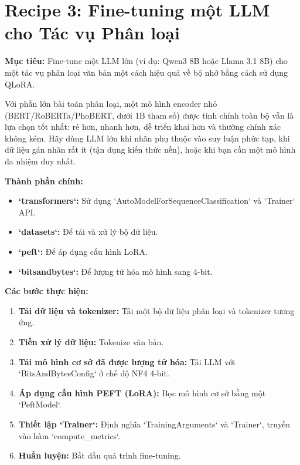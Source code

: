 
\section{Recipe 3: Fine-tuning một LLM cho Tác vụ Phân loại}
\label{sec:recipe_classification_finetuning}

\textbf{Mục tiêu:} Fine-tune một LLM lớn (ví dụ: Qwen3 8B hoặc Llama 3.1 8B) cho một tác vụ phân loại văn bản một cách hiệu quả về bộ nhớ bằng cách sử dụng QLoRA.

\begin{tcolorbox}[colback=yellow!10!white, colframe=yellow!50!black, title={Khi nào \emph{không} nên dùng công thức này \newtag}, fonttitle=\bfseries]
Với phần lớn bài toán phân loại, một mô hình encoder nhỏ (BERT/RoBERTa/PhoBERT, dưới 1B tham số) được tinh chỉnh toàn bộ vẫn là lựa chọn tốt nhất: rẻ hơn, nhanh hơn, dễ triển khai hơn và thường chính xác không kém. Hãy dùng LLM lớn khi nhãn phụ thuộc vào suy luận phức tạp, khi dữ liệu gán nhãn rất ít (tận dụng kiến thức nền), hoặc khi bạn cần một mô hình đa nhiệm duy nhất.
\end{tcolorbox}

\textbf{Thành phần chính:}
\begin{itemize}
    \item \textbf{`transformers`:} Sử dụng `AutoModelForSequenceClassification` và `Trainer` API.
    \item \textbf{`datasets`:} Để tải và xử lý bộ dữ liệu.
    \item \textbf{`peft`:} Để áp dụng cấu hình LoRA.
    \item \textbf{`bitsandbytes`:} Để lượng tử hóa mô hình sang 4-bit.
\end{itemize}

\textbf{Các bước thực hiện:}
\begin{enumerate}
    \item \textbf{Tải dữ liệu và tokenizer:} Tải một bộ dữ liệu phân loại và tokenizer tương ứng.
    \item \textbf{Tiền xử lý dữ liệu:} Tokenize văn bản.
    \item \textbf{Tải mô hình cơ sở đã được lượng tử hóa:} Tải LLM với `BitsAndBytesConfig` ở chế độ NF4 4-bit.
    \item \textbf{Áp dụng cấu hình PEFT (LoRA):} Bọc mô hình cơ sở bằng một `PeftModel`.
    \item \textbf{Thiết lập `Trainer`:} Định nghĩa `TrainingArguments` và `Trainer`, truyền vào hàm `compute\_metrics`.
    \item \textbf{Huấn luyện:} Bắt đầu quá trình fine-tuning.
\end{enumerate}

